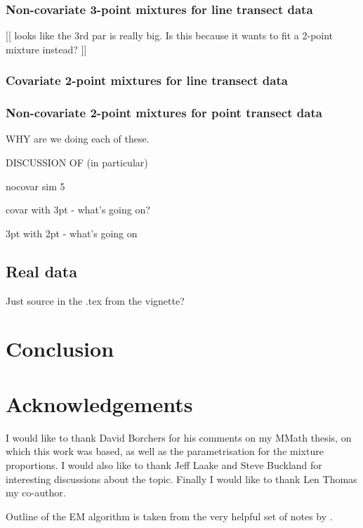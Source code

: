 \subsubsection{Non-covariate 3-point mixtures for line transect data}


[[ looks like the 3rd par is really big. Is this because it wants to fit a 2-point mixture instead? ]]


\subsubsection{Covariate 2-point mixtures for line transect data}


\subsubsection{Non-covariate 2-point mixtures for point transect data}


WHY are we doing each of these.

DISCUSSION OF (in particular)

nocovar sim 5

covar with 3pt - what's going on?

3pt with 2pt - what's going on





\subsection{Real data}

Just source in the .tex from the vignette?




\section{Conclusion}


\section{Acknowledgements}

I would like to thank David Borchers for his comments on my MMath thesis, on which this work was based, as well as the parametrisation for the mixture proportions. I would also like to thank Jeff Laake and Steve Buckland for interesting discussions about the topic. Finally I would like to thank Len Thomas my co-author.

Outline of the EM algorithm is taken from the very helpful set of notes by \cite{piater}.

